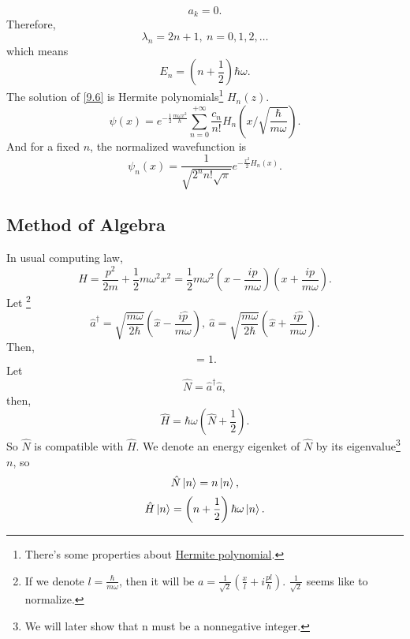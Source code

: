 \documentclass{article}
\theoremstyle{1}
\begin{document}
\begin{equation}
    a_{k}=0.
\end{equation}
Therefore, 
\begin{equation}
    \lambda_n=2n+1,\ n=0,1,2,\dots
\end{equation}
which means 
\begin{equation}
    E_n=\left(n+\frac{1}{2}\right)\hbar \omega.
\end{equation}
The solution of \eqref{9.6} is Hermite polynomials\footnote{There's some properties about \href{run:Hermite polynomial.pdf alias}{Hermite polynomial}.} $H_n(z)$.
\begin{equation}
    \psi(x)=e^{-\frac{1}{2}\frac{m\omega x^2}{\hbar}}\sum_{n=0}^{+\infty}\frac{c_n}{n!}H_n\left(x\slash\sqrt{\frac{\hbar}{m\omega}}\right).
\end{equation}
And for a fixed $n$, the normalized wavefunction is
\begin{equation}
    \psi_n(x)=\frac{1}{\sqrt{2^nn!\sqrt{\pi}}}e^{-\frac{x^2}{2}H_n(x)}.
\end{equation}


\subsection{Method of Algebra}
In usual computing law, 
\begin{equation}
    H=\frac{p^2}{2m}+\frac{1}{2}m\omega^2x^2=\frac{1}{2}m\omega^2\left(x-\frac{ip}{m\omega}\right)\left(x+\frac{ip}{m\omega}\right).
\end{equation}
Let \footnote{If we denote $l=\frac{\hbar}{m\omega}$, then it will be $a=\frac{1}{\sqrt{2}}\left(\frac{x}{l}+i\frac{pl}{\hbar}\right)$. $\frac{1}{\sqrt{2}}$ seems like to normalize.}
\begin{equation}
    \hat{a}^\dagger=\sqrt{\frac{m\omega}{2\hbar}}\left(\hat{x}-\frac{i\hat{p}}{m\omega}\right),\ \hat{a}=\sqrt{\frac{m\omega}{2\hbar}}\left(\hat{x}+\frac{i\hat{p}}{m\omega}\right).
\end{equation}
Then, 
\begin{equation}
    [\hat{a},\hat{a}^\dagger]=1.
\end{equation}
Let 
\begin{equation}
    \hat{N}=\hat{a}^\dagger\hat{a},
\end{equation}
then,
\begin{equation}
    \hat{H}=\hbar\omega \left(\hat{N}+\frac{1}{2}\right).
\end{equation}
So $\hat{N}$ is compatible with $\hat{H}$. We denote an energy eigenket of $\hat{N}$ by its eigenvalue\footnote{We will later show that n must be a nonnegative integer.} $n$, so
\begin{equation}
    \hat{N}\ket{n}=n\ket{n},
\end{equation}
\begin{equation}
    \hat{H}\ket{n}=\left(n+\frac{1}{2}\right)\hbar\omega\ket{n}.
\end{equation}
\end{document}
